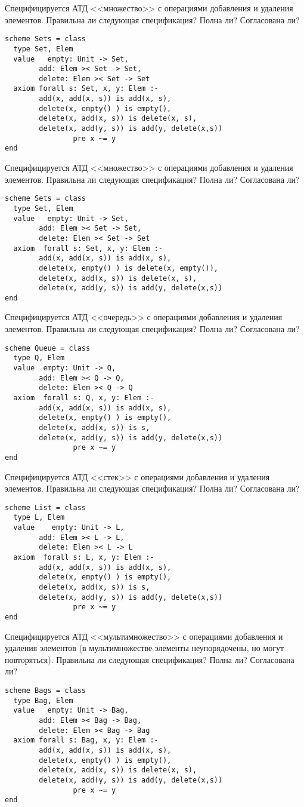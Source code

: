 \z Специфицируется АТД <<множество>> с операциями добавления и удаления элементов. Правильна ли следующая спецификация? Полна ли? Согласована ли?
\begin{lstlisting}
scheme Sets = class
  type Set, Elem
  value   empty: Unit -> Set,
        add: Elem >< Set -> Set,
        delete: Elem >< Set -> Set
  axiom forall s: Set, x, y: Elem :-
        add(x, add(x, s)) is add(x, s),
        delete(x, empty() ) is empty(),
        delete(x, add(x, s)) is delete(x, s),
        delete(x, add(y, s)) is add(y, delete(x,s))
                pre x ~= y
end
\end{lstlisting}

\z Специфицируется АТД <<множество>> с операциями добавления и удаления элементов. Правильна ли следующая спецификация? Полна ли? Согласована ли?
\begin{lstlisting}
scheme Sets = class
  type Set, Elem
  value   empty: Unit -> Set,
        add: Elem >< Set -> Set,
        delete: Elem >< Set -> Set
  axiom  forall s: Set, x, y: Elem :-
        add(x, add(x, s)) is add(x, s),
        delete(x, empty() ) is delete(x, empty()),
        delete(x, add(x, s)) is delete(x, s),
        delete(x, add(y, s)) is add(y, delete(x,s))
end
\end{lstlisting}

\z Специфицируется АТД <<очередь>> с операциями добавления и удаления элементов. Правильна ли следующая спецификация? Полна ли? Согласована ли?
\begin{lstlisting}
scheme Queue = class
  type Q, Elem
  value  empty: Unit -> Q,
        add: Elem >< Q -> Q,
        delete: Elem >< Q -> Q
  axiom  forall s: Q, x, y: Elem :-
        add(x, add(x, s)) is add(x, s),
        delete(x, empty() ) is empty(),
        delete(x, add(x, s)) is s,
        delete(x, add(y, s)) is add(y, delete(x,s))
                pre x ~= y
end
\end{lstlisting}

\z Специфицируется АТД <<стек>> с операциями добавления и удаления элементов. Правильна ли следующая спецификация? Полна ли? Согласована ли?
\begin{lstlisting}
scheme List = class
  type L, Elem
  value    empty: Unit -> L,
        add: Elem >< L -> L,
        delete: Elem >< L -> L
  axiom  forall s: L, x, y: Elem :-
        add(x, add(x, s)) is add(x, s),
        delete(x, empty() ) is empty(),
        delete(x, add(x, s)) is s,
        delete(x, add(y, s)) is add(y, delete(x,s))
                pre x ~= y
end
\end{lstlisting}

\z Специфицируется АТД <<мультимножество>> с операциями добавления и удаления элементов (в мультимножестве элементы неупорядочены, но могут повторяться). Правильна ли следующая спецификация? Полна ли? Согласована ли?
\begin{lstlisting}
scheme Bags = class
  type Bag, Elem
  value   empty: Unit -> Bag,
        add: Elem >< Bag -> Bag,
        delete: Elem >< Bag -> Bag
  axiom forall s: Bag, x, y: Elem :-
        add(x, add(x, s)) is add(x, s),
        delete(x, empty() ) is empty(),
        delete(x, add(x, s)) is delete(x, s),
        delete(x, add(y, s)) is add(y, delete(x,s))
                pre x ~= y
end
\end{lstlisting}
